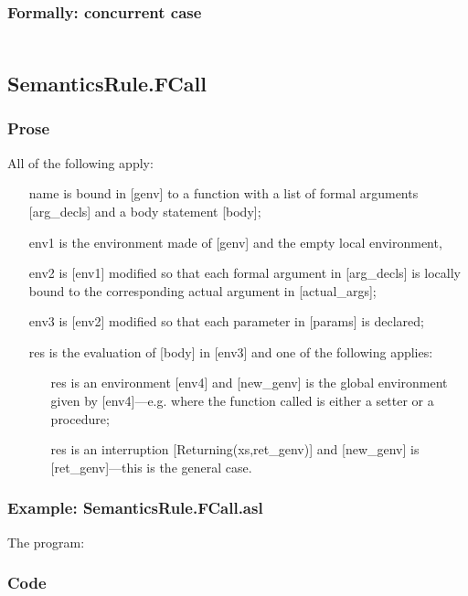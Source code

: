 \documentclass{book}
\begin{document}
  \subsubsection{Formally: concurrent case}
  \begin{align}
  \end{align} 

\subsection{SemanticsRule.FCall \label{sec:SemanticsRule.FCall}}

  \subsubsection{Prose}
  All of the following apply:
  \begin{itemize}
  \item [name] is bound in [genv] to a function with a list of formal arguments
    [arg\_decls] and a body statement [body];
  \item [env1] is the environment made of [genv] and the empty local environment,
  \item [env2] is [env1] modified so that each formal argument in [arg\_decls] is
    locally bound to the corresponding actual argument in [actual\_args];
  \item [env3] is [env2] modified so that each parameter in [params] is declared;
  \item [res] is the evaluation of [body] in [env3] and one of the following
    applies:
      \begin{itemize}
      \item [res] is an environment [env4] and [new\_genv] is the global environment
        given by [env4]---e.g. where the function called is either a setter or
        a procedure;
      \item [res] is an interruption [Returning(xs,ret\_genv)] and [new\_genv] is
        [ret\_genv]---this is the general case.
      \end{itemize}
  \end{itemize}

  \subsubsection{Example: SemanticsRule.FCall.asl}
  The program:

  \subsubsection{Code}
\end{document}
